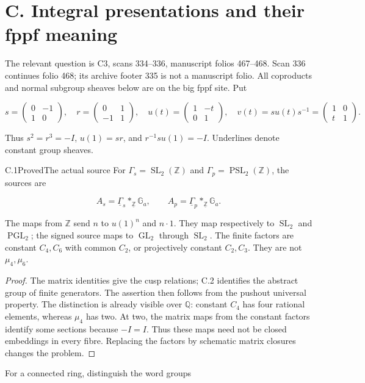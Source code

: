 \section{C. Integral presentations and their fppf meaning}
\label{sec:C}
The relevant question is C3, scans 334--336, manuscript folios
467--468. Scan 336 continues folio 468; its archive footer 335 is
not a manuscript folio. All coproducts and normal subgroup sheaves
below are on the big fppf site. Put

$$
s=\begin{pmatrix}0&-1\\1&0\end{pmatrix},\quad
 r=\begin{pmatrix}0&1\\-1&1\end{pmatrix},\quad
 u(t)=\begin{pmatrix}1&-t\\0&1\end{pmatrix},\quad
 v(t)=su(t)s^{-1}=\begin{pmatrix}1&0\\t&1\end{pmatrix}.
$$

Thus $s^2=r^3=-I$, $u(1)=sr$, and $r^{-1}su(1)=-I$.
Underlines denote constant group sheaves.

\begin{statement}{C.1}{Proved}{The actual source}
For $\Gamma_s=\operatorname{SL}_2(\mathbb Z)$ and
$\Gamma_p=\operatorname{PSL}_2(\mathbb Z)$, the sources are

$$
A_s=\underline\Gamma_s*_{\underline{\mathbb Z}}\mathbb G_a,
 \qquad A_p=\underline\Gamma_p*_{\underline{\mathbb Z}}\mathbb G_a.
$$

The maps from $\mathbb Z$ send $n$ to $u(1)^n$ and $n\cdot1$.
They map respectively to $\operatorname{SL}_2$ and
$\operatorname{PGL}_2$; the signed source maps to
$\operatorname{GL}_2$ through $\operatorname{SL}_2$.
The finite factors are constant $C_4,C_6$ with common $C_2$,
or projectively constant $C_2,C_3$. They are not $\mu_4,\mu_6$.
\end{statement}
\begin{proof}
The matrix identities give the cusp relations; C.2 identifies the
abstract group of finite generators. The assertion then follows
from the pushout universal property. The distinction is already
visible over $\mathbb Q$: constant $C_4$ has four rational
elements, whereas $\mu_4$ has two. At two, the matrix maps from
the constant factors identify some sections because $-I=I$.
Thus these maps need not be closed embeddings in every fibre.
Replacing the factors by schematic matrix closures changes the
problem.
\end{proof}
For a connected ring, distinguish the word groups

